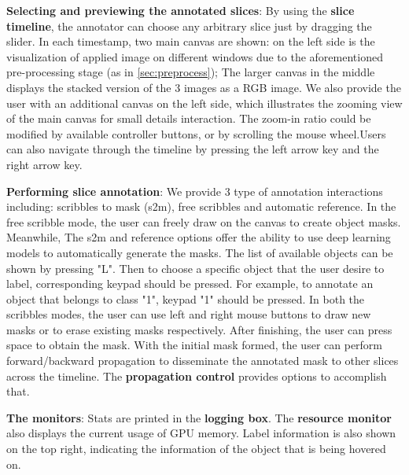 
\textbf{Selecting and previewing the annotated slices}: 
By using the \textbf{slice timeline}, the annotator can choose any arbitrary slice just by dragging the slider. In each timestamp, two main canvas are shown: on the left side is the visualization of applied image on different windows due to the aforementioned pre-processing stage (as in \ref{sec:preprocess}); The larger canvas in the middle displays the stacked version of the 3 images as a RGB image. 
We also provide the user with an additional canvas on the left side, which illustrates the zooming view of the main canvas for small details interaction. The zoom-in ratio could be modified by available controller buttons, or by scrolling the mouse wheel.Users can also navigate through the timeline by pressing the left arrow key and the right arrow key. 

\textbf{Performing slice annotation}: 
We provide 3 type of annotation interactions including: scribbles to mask (s2m), free scribbles and automatic reference. In the free scribble mode, the user can freely draw on the canvas to create object masks. Meanwhile, The s2m and reference options offer the ability to use deep learning models to automatically generate the masks. 
The list of available objects can be shown by pressing "L". Then to choose a specific object that the user desire to label, corresponding keypad should be pressed. For example, to annotate an object that belongs to class "1", keypad "1" should be pressed. In both the scribbles modes, the user can use left and right mouse buttons to draw new masks or to erase existing masks respectively. After finishing, the user can press space to obtain the mask. With the initial mask formed, the user can perform forward/backward propagation to disseminate the annotated mask to other slices across the timeline. The \textbf{propagation control} provides options to accomplish that.

\textbf{The monitors}: Stats are printed in the \textbf{logging box}. The \textbf{resource monitor} also displays the current usage of GPU memory. Label information is also shown on the top right, indicating the information of the  object that is being hovered on.